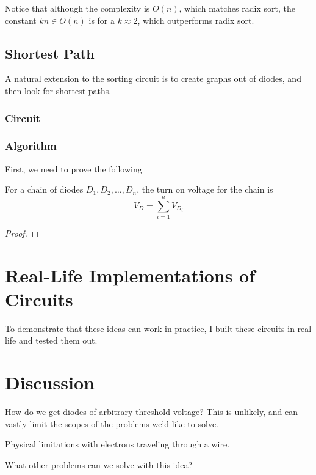 \documentclass{article}
\begin{document}
Notice that although the complexity is $O(n)$, which matches radix sort,
the constant $kn \in O(n)$ is for a $k \approx 2$, which outperforms radix sort.

\subsection{Shortest Path}
A natural extension to the sorting circuit is to create graphs out of diodes,
and then look for shortest paths.

\subsubsection{Circuit}

\subsubsection{Algorithm}

First, we need to prove the following

\begin{lemma}
For a chain of diodes $D_1, D_2, \dots, D_n$, the turn on voltage for the
chain is
\begin{equation}
	V_D = \sum_{i=1}^n V_{D_i}
\end{equation}
\end{lemma}

\begin{proof}

\end{proof}

\section{Real-Life Implementations of Circuits}

To demonstrate that these ideas can work in practice, I built these circuits
in real life and tested them out.

\section{Discussion}

How do we get diodes of arbitrary threshold voltage?
This is unlikely, and can vastly limit the scopes of the problems we'd like to solve.

Physical limitations with electrons traveling through a wire.

What other problems can we solve with this idea?




\end{document}
